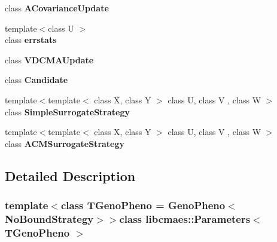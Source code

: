 \begin{DoxyCompactItemize}
\item 
\hypertarget{classlibcmaes_1_1Parameters_a81af003765a6521a192e5a37612c2fb5}{class {\bfseries A\-Covariance\-Update}}\label{classlibcmaes_1_1Parameters_a81af003765a6521a192e5a37612c2fb5}

\item 
\hypertarget{classlibcmaes_1_1Parameters_a867bde5f83097a4db1f667a3911efbae}{{\footnotesize template$<$class U $>$ }\\class {\bfseries errstats}}\label{classlibcmaes_1_1Parameters_a867bde5f83097a4db1f667a3911efbae}

\item 
\hypertarget{classlibcmaes_1_1Parameters_a3fceefe6a1e378ff9fef5d97117e5f47}{class {\bfseries V\-D\-C\-M\-A\-Update}}\label{classlibcmaes_1_1Parameters_a3fceefe6a1e378ff9fef5d97117e5f47}

\item 
\hypertarget{classlibcmaes_1_1Parameters_afb3142edf2def9ad64b319487505f2eb}{class {\bfseries Candidate}}\label{classlibcmaes_1_1Parameters_afb3142edf2def9ad64b319487505f2eb}

\item 
\hypertarget{classlibcmaes_1_1Parameters_a25db0dd344a7c35115d952760c5f18b9}{{\footnotesize template$<$template$<$ class X, class Y $>$ class U, class V , class W $>$ }\\class {\bfseries Simple\-Surrogate\-Strategy}}\label{classlibcmaes_1_1Parameters_a25db0dd344a7c35115d952760c5f18b9}

\item 
\hypertarget{classlibcmaes_1_1Parameters_a5b77ea4bdc16988504a45aead303d863}{{\footnotesize template$<$template$<$ class X, class Y $>$ class U, class V , class W $>$ }\\class {\bfseries A\-C\-M\-Surrogate\-Strategy}}\label{classlibcmaes_1_1Parameters_a5b77ea4bdc16988504a45aead303d863}

\end{DoxyCompactItemize}


\subsection{Detailed Description}
\subsubsection*{template$<$class T\-Geno\-Pheno = Geno\-Pheno$<$\-No\-Bound\-Strategy$>$$>$class libcmaes\-::\-Parameters$<$ T\-Geno\-Pheno $>$}

